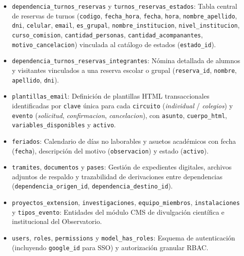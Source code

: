 \begin{itemize}
    \item \texttt{dependencia\_\allowbreak turnos\_\allowbreak reservas} y \texttt{turnos\_\allowbreak reservas\_\allowbreak estados}: Tabla central de reservas de turnos (\texttt{codigo}, \texttt{fecha\_\allowbreak hora}, \texttt{fecha}, \texttt{hora}, \texttt{nombre\_\allowbreak apellido}, \texttt{dni}, \texttt{celular}, \texttt{email}, \texttt{es\_\allowbreak grupal}, \texttt{nombre\_\allowbreak institucion}, \texttt{nivel\_\allowbreak institucion}, \texttt{curso\_\allowbreak comision}, \texttt{cantidad\_\allowbreak personas}, \texttt{cantidad\_\allowbreak acompanantes}, \texttt{motivo\_\allowbreak cancelacion}) vinculada al catálogo de estados (\texttt{estado\_\allowbreak id}).
    \item \texttt{dependencia\_\allowbreak turnos\_\allowbreak reservas\_\allowbreak integrantes}: Nómina detallada de alumnos y visitantes vinculados a una reserva escolar o grupal (\texttt{reserva\_\allowbreak id}, \texttt{nombre}, \texttt{apellido}, \texttt{dni}).
    \item \texttt{plantillas\_\allowbreak email}: Definición de plantillas HTML transaccionales identificadas por \texttt{clave} única para cada \texttt{circuito} (\textit{individual} / \textit{colegios}) y \texttt{evento} (\textit{solicitud}, \textit{confirmacion}, \textit{cancelacion}), con \texttt{asunto}, \texttt{cuerpo\_\allowbreak html}, \texttt{variables\_\allowbreak disponibles} y \texttt{activo}.
    \item \texttt{feriados}: Calendario de días no laborables y asuetos académicos con fecha (\texttt{fecha}), descripción del motivo (\texttt{observacion}) y estado (\texttt{activo}).
    \item \texttt{tramites}, \texttt{documentos} y \texttt{pases}: Gestión de expedientes digitales, archivos adjuntos de respaldo y trazabilidad de derivaciones entre dependencias (\texttt{dependencia\_\allowbreak origen\_\allowbreak id}, \texttt{dependencia\_\allowbreak destino\_\allowbreak id}).
    \item \texttt{proyectos\_\allowbreak extension}, \texttt{in\-ves\-ti\-ga\-cio\-nes}, \texttt{equipo\_\allowbreak miembros}, \texttt{ins\-ta\-la\-cio\-nes} y \texttt{tipos\_\allowbreak evento}: Entidades del módulo CMS de divulgación científica e institucional del Observatorio.
    \item \texttt{users}, \texttt{roles}, \texttt{permissions} y \texttt{model\_\allowbreak has\_\allowbreak roles}: Esquema de autenticación (incluyendo \texttt{google\_\allowbreak id} para SSO) y autorización granular RBAC.
\end{itemize}


